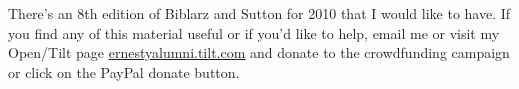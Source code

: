 \documentclass[10pt]{amsart}
\begin{document}
There's an 8th edition of Biblarz and Sutton \cite{GSuttonOBiblarz2001} for 2010 that I would like to have.  If you find any of this material useful or if you'd like to help, email me or visit my Open/Tilt page \url{ernestyalumni.tilt.com} and donate to the crowdfunding campaign or click on the PayPal donate button.  



\clearpage
\onecolumn






\newpage


%
\end{document}
